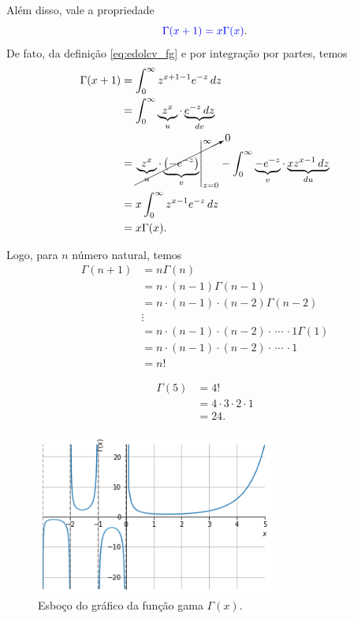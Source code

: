 Além disso, vale a propriedade
\begin{equation}\label{eq:edolcv_fgp1}
  {\color{blue}\Gamma(x+1) = x\Gamma(x)}.
\end{equation}
De fato, da definição \eqref{eq:edolcv_fg} e por integração por partes, temos
\begin{align}
  \Gamma(x+1) &= \int_0^\infty z^{x+1-1}e^{-z}\,dz\\
  &= \int_0^\infty \underbrace{z^x}_{u}\cdot \underbrace{e^{-z}\,dz}_{dv}\\
  &= \cancelto{0}{\left.\underbrace{z^x}_{u}\cdot\underbrace{\left(-e^{-z}\right)}_{v}\right|_{z=0}^\infty} - \int_{0}^\infty \underbrace{-e^{-z}}_{v}\cdot \underbrace{xz^{x-1}\,dz}_{du}\\
  &= x\int_0^\infty z^{x-1}e^{-z}\,dz\\
  &= x\Gamma(x).
\end{align}

Logo, para $n$ número natural, temos
\begin{align}
  \Gamma(n+1) &= n\Gamma(n)\\
  &=n\cdot (n-1)\Gamma(n-1)\\
  &=n\cdot (n-1)\cdot (n-2)\Gamma(n-2)\\
  &\vdots\\
  &= n\cdot (n-1)\cdot (n-2)\cdot\, \cdots\, \cdot 1\Gamma(1)\\
  &= n\cdot (n-1)\cdot (n-2)\cdot\, \cdots\, \cdot 1 \\
  &= n!
\end{align}

\begin{ex}
  \begin{align}
    \Gamma(5) &= 4! \\
    &= 4\cdot 3\cdot 2\cdot 1 \\
    &= 24.
  \end{align}
\end{ex}

\begin{figure}[H]
  \centering
  \includegraphics[width=0.7\textwidth]{cap_edolcv/dados/fig_edolcv_fg/fig}
  \caption{Esboço do gráfico da função gama $\Gamma(x)$.}
  \label{fig:edolcv_fg}
\end{figure}

